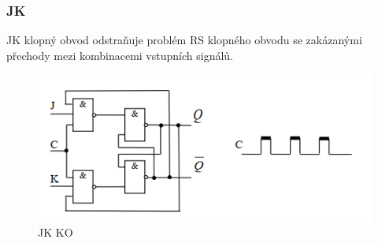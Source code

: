 \subsubsection*{JK}
JK klopný obvod odstraňuje problém RS klopného obvodu se zakázanými přechody
mezi kombinacemi vstupních signálů.
   \begin{figure}[h]
   \begin{center}
     \includegraphics[scale=0.6]{images/JK.png}
   \end{center}
   \caption{JK KO}
  \end{figure} 



